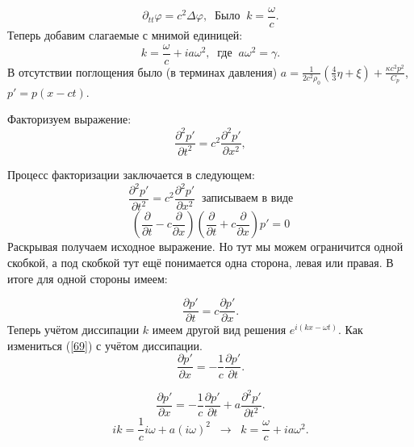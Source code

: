 \documentclass[14pt,a4paper,oneside]{extarticle}	%
\begin{document}
\begin{equation*}
\partial_{tt}\varphi = c^{2}\Delta\varphi, \;\; \text{Было} \;\; k = \frac{\omega}{c}.
\end{equation*}
Теперь добавим слагаемые с мнимой единицей:
\begin{equation*}
k = \frac{\omega}{c} + ia\omega^{2}, \;\; \text{где} \;\; a\omega^{2} = \gamma.
\end{equation*}
В отсутствии поглощения было (в терминах давления) $ a = \frac{1}{2c^{2}\rho_{0}}\left( \frac{4}{3}\eta + \xi\right) + \frac{\kappa c^{2} p^{2}}{C_{p}} $, $ p' = p(x - ct) $.

Факторизуем выражение:
\begin{equation*}
\frac{\partial^{2} p'}{\partial t^{2}} = c^{2}\frac{\partial^{2} p'}{\partial x^{2}},
\end{equation*}

Процесс факторизации заключается в следующем:
\begin{equation*}
\frac{\partial^{2} p'}{\partial t^{2}} = c^{2}\frac{\partial^{2} p'}{\partial x^{2}} \;\; \text{записываем в виде}
\end{equation*}
\begin{equation*}
\left( \frac{\partial}{\partial t} - c\frac{\partial}{\partial x}  \right)\left( \frac{\partial}{\partial t} + c\frac{\partial}{\partial x}  \right)p' = 0
\end{equation*}
Раскрывая получаем исходное выражение. Но тут мы можем ограничится одной скобкой, а под скобкой тут ещё понимается одна сторона, левая или правая.
В итоге для одной стороны имеем:

\begin{equation*}
\frac{\partial p'}{\partial t} = c\frac{\partial p'}{\partial x}. 
\end{equation*}
Теперь учётом диссипации $ k $ имеем другой вид решения $ e^{i(kx-\omega t)} $. Как измениться (\ref{69}) с учётом диссипации.
\begin{equation}\label{69}
\frac{\partial p'}{\partial x} = - \frac{1}{c}\frac{\partial p'}{\partial t}.
\end{equation}

\begin{equation*}
\frac{\partial p'}{\partial x} = - \frac{1}{c}\frac{\partial p'}{\partial t} + a\frac{\partial^{2} p'}{\partial t^{2}}.
\end{equation*}
\begin{equation*}
ik = \frac{1}{c}i\omega + a(i\omega)^{2} \;\;\longrightarrow\;\; k = \frac{\omega}{c} + ia\omega^{2}.
\end{equation*}
\end{document}
